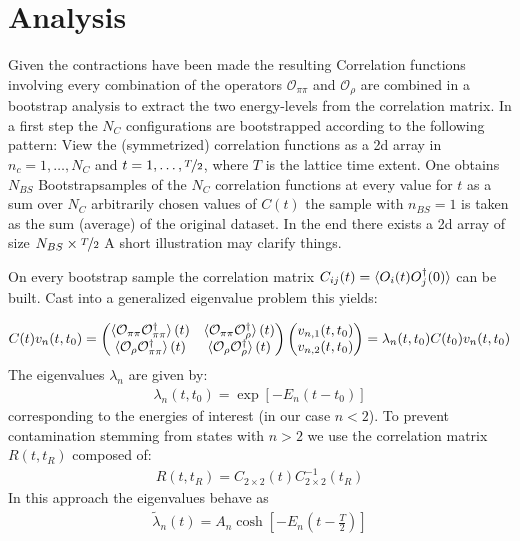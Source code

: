 \documentclass[12pt,a4paper]{scrartcl}
\begin{document}
\section{Analysis}
Given the contractions have been made the resulting Correlation functions
involving every combination of the operators $\mathcal{O}_{\pi\pi}$ and
$\mathcal{O}_{\rho}$ are combined in a bootstrap analysis to extract the two
energy-levels from the correlation matrix. In a first step the $N_C$
configurations are bootstrapped according to the following pattern:
View the (symmetrized) correlation functions as a 2d array in $n_c =
1,\dots,N_C$ and $t = 1,\dots, \nicefrac{T}{2}$, where $T$ is the lattice time
extent. One obtains $N_{BS}$ Bootstrapsamples of the $N_C$ correlation functions at
every value for $t$ as a sum over $N_C$ arbitrarily chosen values of $C(t)$ the
sample with $n_{BS} = 1$ is taken as the sum (average) of the original dataset.
In the end there exists a 2d array of size $N_{BS}\times \nicefrac{T}{2}$ 
A short illustration may clarify things.
%  

On every bootstrap sample the correlation matrix $C_{ij}(t) =
\braket{O_i(t)O^{\dag}_j(0)}$ can be built. Cast into a generalized eigenvalue
problem this yields:

\begin{align}
  C(t)v_n(t,t_0) = \begin{pmatrix}
    \braket{\mathcal{O}_{\pi\pi}\mathcal{O}^{\dag}_{\pi\pi}}(t) &
    \braket{\mathcal{O}_{\pi\pi}\mathcal{O}^{\dag}_{\rho}}(t) \\
    \braket{\mathcal{O}_{\rho}\mathcal{O}^{\dag}_{\pi\pi}}(t) &
    \braket{\mathcal{O}_{\rho}\mathcal{O}^{\dag}_{\rho}}(t)
  \end{pmatrix} \begin{pmatrix} v_{n,1}(t,t_0) \\ v_{n,2}(t,t_0) \end{pmatrix} =
  \lambda_n(t,t_0) C(t_0) v_n(t,t_0)
\end{align}
The eigenvalues $\lambda_n$ are given by:
\begin{align}
  \lambda_n(t,t_0) = \exp[-E_n(t-t_0)]
\end{align}
corresponding to the energies of interest (in our case $n < 2$). To prevent
contamination stemming from states with $n > 2$ we use the correlation matrix
$R(t,t_R)$ composed of:
\begin{align}
  R(t,t_R)=C_{2\times 2}(t)C^{-1}_{2\times 2}(t_R)
\end{align}
In this approach the eigenvalues behave as
\begin{align}
  \tilde{\lambda}_n(t) = A_n \cosh\left[-E_n\left(t-\frac{T}{2}\right)\right]
\end{align}
\end{document}

